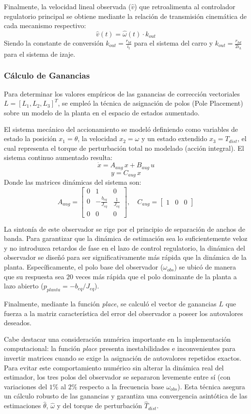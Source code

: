 \documentclass[11pt]{article}                                    %
\begin{document}
Finalmente, la velocidad lineal observada ($\hat{v}$) que retroalimenta al controlador regulatorio principal se obtiene mediante la relación de transmisión cinemática de cada mecanismo respectivo:
$$\hat{v}(t) = \hat{\omega}(t) \cdot k_{out}$$
Siendo la constante de conversión $k_{out} = \frac{r_{td}}{i_t}$ para el sistema del carro y $k_{out} = \frac{r_{hd}}{2 i_h}$ para el sistema de izaje.

\subsubsection{Cálculo de Ganancias}
Para determinar los valores empíricos de las ganancias de corrección vectoriales $L = [L_1, L_2, L_3]^T$, se empleó la técnica de asignación de polos (Pole Placement) sobre un modelo de la planta en el espacio de estados aumentado.

El sistema mecánico del accionamiento se modeló definiendo como variables de estado la posición $x_1 = \theta$, la velocidad $x_2 = \omega$ y un estado extendido $x_3 = T_{dist}$, el cual representa el torque de perturbación total no modelado (acción integral). El sistema continuo aumentado resulta:
$$\dot{x} = A_{aug} \, x + B_{aug} \, u$$
$$y = C_{aug} \, x$$
Donde las matrices dinámicas del sistema son:
$$A_{aug} = \begin{bmatrix} 0 & 1 & 0 \\ 0 & -\frac{b_{eq}}{J_{eq}} & \frac{1}{J_{eq}} \\ 0 & 0 & 0 \end{bmatrix}, \quad C_{aug} = \begin{bmatrix} 1 & 0 & 0 \end{bmatrix}$$

La sintonía de este observador se rige por el principio de separación de anchos de banda. Para garantizar que la dinámica de estimación sea lo suficientemente veloz y no introduzca retardos de fase en el lazo de control regulatorio, la dinámica del observador se diseñó para ser significativamente más rápida que la dinámica de la planta. Específicamente, el polo base del observador ($\omega_{obs}$) se ubicó de manera que su respuesta sea $20$ veces más rápida que el polo dominante de la planta a lazo abierto ($p_{planta} = -b_{eq}/J_{eq}$).

Finalmente, mediante la función \textit{place}, se calculó el vector de ganancias $L$ que fuerza a la matriz característica del error del observador a poseer los autovalores deseados. 

Cabe destacar una consideración numérica importante en la implementación computacional: la función \textit{place} presenta inestabilidades e inconvenientes para invertir matrices cuando se exige la asignación de autovalores repetidos exactos. Para evitar este comportamiento numérico sin alterar la dinámica real del estimador, los tres polos del observador se separaron levemente entre sí (con variaciones del $1\%$ al $2\%$ respecto a la frecuencia base $\omega_{obs}$). Esta técnica asegura un cálculo robusto de las ganancias y garantiza una convergencia asintótica de las estimaciones $\hat{\theta}$, $\hat{\omega}$ y del torque de perturbación $\hat{T}_{dist}$.
\end{document}
